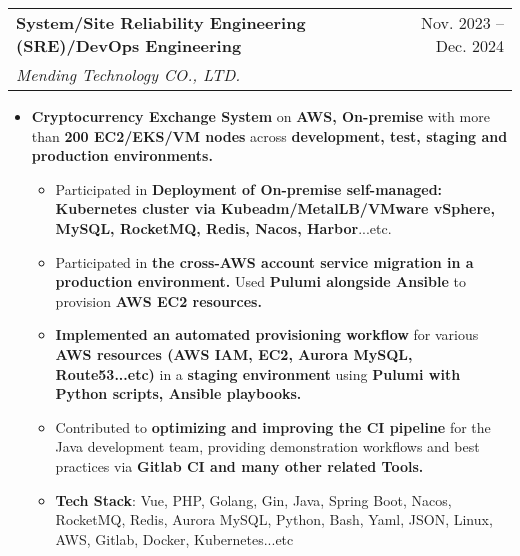 \documentclass[letterpaper,11pt]{article}
\makeatletter
\newcommand{\resumeItem}[1]{
  \item\small{
    {#1 \vspace{-1pt}}
  }
}
\newcommand{\resumeSubheading}[4]{
  \vspace{-1pt}\item
    \begin{tabular*}{\textwidth}[t]{l@{\extracolsep{\fill}}r}
      \textbf{#1} & {\color{dark-grey}\small #2}\vspace{1pt}\\ %
      \textit{#3} & {\color{dark-grey} \small #4}\\ %
    \end{tabular*}\vspace{-4pt}
}
\newcommand{\resumeSubItem}[1]{
  \begin{itemize}
    \item \small{#1 \vspace{-1pt}}
  \end{itemize}
}
\newcommand{\resumeItemListStart}{\begin{itemize}}
\newcommand{\resumeItemListEnd}{\end{itemize}\vspace{0pt}}
\makeatother
\begin{document}
  \resumeSubheading
  {System/Site Reliability Engineering (SRE)/DevOps Engineering}{Nov. 2023 -- Dec. 2024}
  {Mending Technology CO., LTD.}{}  
  \resumeItemListStart
    \resumeItem{\textbf{Cryptocurrency Exchange System} on \textbf{AWS, On-premise} with more than \textbf{200 EC2/EKS/VM nodes} across \textbf{development, test, staging and production environments.}}
      \resumeSubItem{Participated in \textbf{Deployment of On-premise self-managed: Kubernetes cluster via Kubeadm/MetalLB/VMware vSphere, MySQL, RocketMQ, Redis, Nacos, Harbor}...etc.}
      \resumeSubItem{Participated in \textbf{the cross-AWS account service migration in a production environment.} Used \textbf{Pulumi alongside Ansible} to provision \textbf{AWS EC2 resources.}}
      \resumeSubItem{\textbf{Implemented an automated provisioning workflow} for various \textbf{AWS resources (AWS IAM, EC2, Aurora MySQL, Route53...etc)} in a \textbf{staging environment} using \textbf{Pulumi with Python scripts, Ansible playbooks.}}
      \resumeSubItem{Contributed to \textbf{optimizing and improving the CI pipeline} for the Java development team, providing demonstration workflows and best practices via \textbf{Gitlab CI and many other related Tools.}}
      \resumeSubItem{\textbf{Tech Stack}: Vue, PHP, Golang, Gin, Java, Spring Boot, Nacos, RocketMQ, Redis, Aurora MySQL, Python, Bash, Yaml, JSON, Linux, AWS, Gitlab, Docker, Kubernetes...etc}
  \resumeItemListEnd
\end{document}
